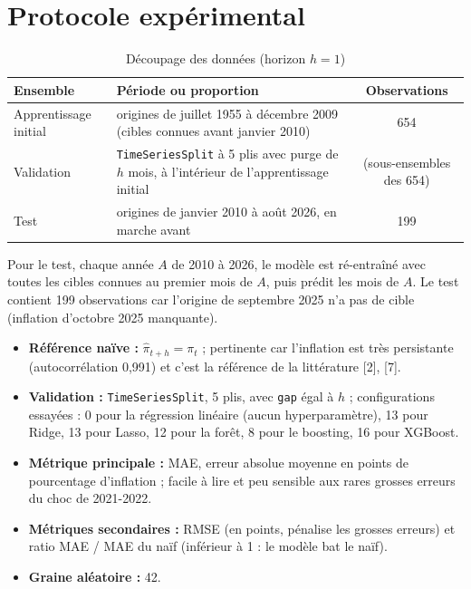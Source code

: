 \documentclass[11pt,a4paper]{article}
\begin{document}
\section{Protocole expérimental}
\begin{table}[H]\centering\small
\caption{Découpage des données (horizon $h=1$)}\label{tab:split}
\begin{tabular}{@{}p{2.7cm}p{6.6cm}c@{}}
\toprule
Ensemble & Période ou proportion & Observations\\\midrule
Apprentissage initial & origines de juillet 1955 à décembre 2009 (cibles connues avant janvier 2010) & 654\\
Validation & \texttt{TimeSeriesSplit} à 5 plis avec purge de $h$ mois, à l'intérieur de l'apprentissage initial & (sous-ensembles des 654)\\
Test & origines de janvier 2010 à août 2026, en marche avant & 199\\
\bottomrule
\end{tabular}
\end{table}
Pour le test, chaque année $A$ de 2010 à 2026, le modèle est ré-entraîné avec toutes les cibles connues au premier mois de $A$, puis prédit les mois de $A$. Le test contient 199 observations car l'origine de septembre 2025 n'a pas de cible (inflation d'octobre 2025 manquante).
\begin{itemize}
\item \textbf{Référence naïve :} $\hat\pi_{t+h}=\pi_t$ ; pertinente car l'inflation est très persistante (autocorrélation 0,991) et c'est la référence de la littérature [2], [7].
\item \textbf{Validation :} \texttt{TimeSeriesSplit}, 5 plis, avec \texttt{gap} égal à $h$ ; configurations essayées : 0 pour la régression linéaire (aucun hyperparamètre), 13 pour Ridge, 13 pour Lasso, 12 pour la forêt, 8 pour le boosting, 16 pour XGBoost.
\item \textbf{Métrique principale :} MAE, erreur absolue moyenne en points de pourcentage d'inflation ; facile à lire et peu sensible aux rares grosses erreurs du choc de 2021-2022.
\item \textbf{Métriques secondaires :} RMSE (en points, pénalise les grosses erreurs) et ratio MAE / MAE du naïf (inférieur à 1 : le modèle bat le naïf).
\item \textbf{Graine aléatoire :} 42.
\end{itemize}

\end{document}
